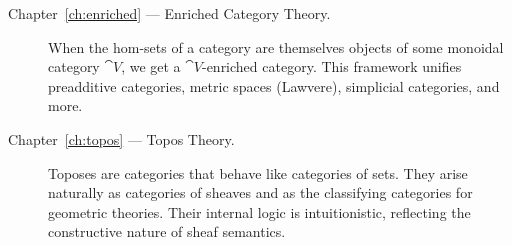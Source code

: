 \begin{description}
  \item[Chapter~\ref{ch:enriched} — Enriched Category Theory.] When the hom-sets of a category are themselves objects of some monoidal category $\cat{V}$, we get a $\cat{V}$-enriched category. This framework unifies preadditive categories, metric spaces (Lawvere), simplicial categories, and more.

  \item[Chapter~\ref{ch:topos} — Topos Theory.] Toposes are categories that behave like categories of sets. They arise naturally as categories of sheaves and as the classifying categories for geometric theories. Their internal logic is intuitionistic, reflecting the constructive nature of sheaf semantics.
\end{description}
